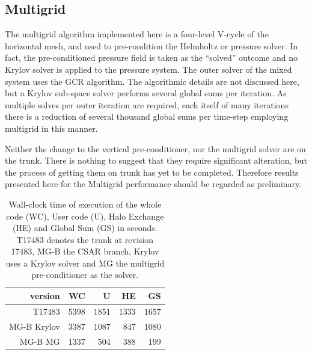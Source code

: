 \subsection{\label{sec:multigrid}Multigrid}
The multigrid algorithm implemented here is a four-level V-cycle of
the horizontal mesh, and used to pre-condition the Helmholtz or
pressure solver. In fact, the pre-conditioned pressure field is taken
as the ``solved'' outcome and no Krylov solver is applied
to the pressure system. The outer solver of the mixed system uses the
GCR algorithm. The algorithmic details are not discussed here, but a
Krylov sub-space solver performs several global sums per iteration. As
multiple solves per outer iteration are required, each itself of many
iterations there is a reduction of several thousand global sums per
time-step employing multigrid in this manner.

Neither the change to the vertical pre-conditioner, nor the multigrid
solver are on the trunk. There is nothing to suggest that they require
significant alteration, but the process of getting them on trunk has
yet to be completed. Therefore results presented here for the
Multigrid performance should be regarded as preliminary.

\begin{table}
\centering
\caption{\label{tab:MG_data}Wall-clock time of execution of the whole code (WC), User
  code (U), Halo Exchange (HE) and Global Sum (GS) in seconds. T17483
  denotes the trunk at revision 17483, MG-B the CSAR branch,
  Krylov uses a Krylov solver and MG the multigrid pre-conditioner as
  the solver.
}
\begin{tabular}{r|rrrr}
version     & WC     & U      & HE     & GS \\\hline
T17483      & $5398$ & $1851$ & $1333$ & $1657$ \\
MG-B Krylov & $3387$ & $1087$ & $847$  & $1080$ \\
MG-B MG     & $1337$ & $504$  & $388$  & $199$ \\\hline
\end{tabular}
\end{table}

